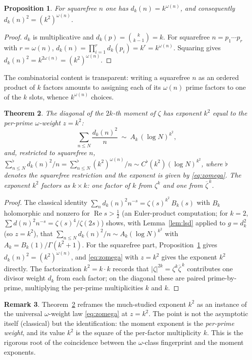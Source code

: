 \documentclass[11pt]{amsart}
\newtheorem{theorem}{Theorem}[section]
\newtheorem{proposition}[theorem]{Proposition}
\theoremstyle{definition}
\newtheorem{remark}[theorem]{Remark}
\newcommand{\re}{\operatorname{Re}}
\newcommand{\half}{\tfrac12}
\newcommand{\dk}{d_k}
\begin{document}
\begin{proposition}\label{prop:dk}
For squarefree $n$ one has $\dk(n)=k^{\omega(n)}$, and consequently $\dk(n)^2=(k^2)^{\omega(n)}$.
\end{proposition}
\begin{proof}
$\dk$ is multiplicative and $\dk(p)=\binom{k}{k-1}=k$. For squarefree $n=p_1\cdots p_r$ with $r=\omega(n)$,
$\dk(n)=\prod_{i=1}^r\dk(p_i)=k^r=k^{\omega(n)}$. Squaring gives $\dk(n)^2=k^{2\omega(n)}=(k^2)^{\omega(n)}$.
\end{proof}

The combinatorial content is transparent: writing a squarefree $n$ as an ordered product of $k$ factors amounts
to assigning each of its $\omega(n)$ prime factors to one of the $k$ slots, whence $k^{\omega(n)}$ choices.

\begin{theorem}\label{thm:weight}
The diagonal of the $2k$-th moment of $\zeta$ has exponent $k^2$ equal to the per-prime $\omega$-weight $z=k^2$:
\[
\sum_{n\le N}\frac{\dk(n)^2}{n}\ \sim\ A_k\,(\log N)^{k^2},
\]
and, restricted to squarefree $n$, $\sum_{n\le N}^{\flat}\dk(n)^2/n=\sum_{n\le N}^{\flat}(k^2)^{\omega(n)}/n\sim
C^{\flat}(k^2)(\log N)^{k^2}$, where $\flat$ denotes the squarefree restriction and the exponent is given by
\eqref{eq:zomega}. The exponent $k^2$ factors as $k\times k$: one factor of $k$ from $\zeta^k$ and one from
$\overline{\zeta}^{\,k}$.
\end{theorem}
\begin{proof}
The classical identity $\sum_n\dk(n)^2 n^{-s}=\zeta(s)^{k^2}\,B_k(s)$ with $B_k$ holomorphic and nonzero for
$\re s>\half$ (an Euler-product computation; for $k=2$, $\sum d(n)^2 n^{-s}=\zeta(s)^4/\zeta(2s)$) shows, with
Lemma~\ref{lem:lsd} applied to $g=\dk^2$ (so $z=k^2$), that $\sum_{n\le N}\dk(n)^2/n\sim A_k(\log N)^{k^2}$ with
$A_k=B_k(1)/\Gamma(k^2+1)$. For the squarefree part, Proposition~\ref{prop:dk} gives $\dk(n)^2=(k^2)^{\omega(n)}$,
and \eqref{eq:zomega} with $z=k^2$ gives the exponent $k^2$ directly. The factorization $k^2=k\cdot k$ records
that $|\zeta|^{2k}=\zeta^k\overline{\zeta}^{\,k}$ contributes one divisor weight $\dk$ from each factor; on the
diagonal these are paired prime-by-prime, multiplying the per-prime multiplicities $k$ and $k$.
\end{proof}

\begin{remark}
Theorem~\ref{thm:weight} reframes the much-studied exponent $k^2$ as an instance of the universal
$\omega$-weight law \eqref{eq:zomega} at $z=k^2$. The point is not the asymptotic itself (classical) but the
identification: the moment exponent is the \emph{per-prime weight}, and its value $k^2$ is the square of the
per-factor multiplicity $k$. This is the rigorous root of the coincidence between the $\omega$-class fingerprint
and the moment exponents.
\end{remark}
\end{document}
